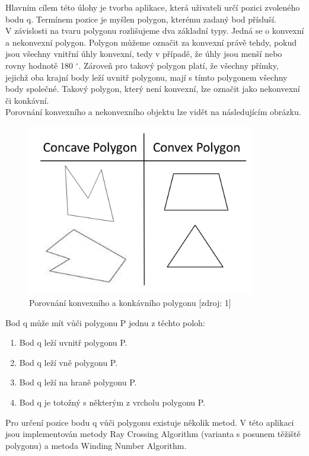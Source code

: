 \documentclass[a4paper, 12pt]{article}
\begin{document}
Hlavním cílem této úlohy je tvorba aplikace, která uživateli určí pozici zvoleného bodu q. Termínem pozice je myšlen polygon, kterému zadaný bod přísluší.
\\

V závislosti na tvaru polygonu rozlišujeme dva základní typy. Jedná se o konvexní a nekonvexní polygon. Polygon můžeme označit za konvexní právě tehdy, pokud jsou všechny vnitřní úhly konvexní, tedy v případě, že úhly jsou menší nebo rovny hodnotě 180 $^\circ$. Zároveň pro takový polygon platí, že všechny přímky, jejichž oba krajní body leží uvnitř polygonu, mají s tímto polygonem všechny body společné. Takový polygon, který není konvexní, lze označit jako nekonvexní či konkávní.
\\

Porovnání konvexního a nekonvexního objektu lze vidět na následujícím obrázku.
\begin{figure}[h]
	\centering
	\includegraphics[width=10cm]{typy_polygonu.jpg}
	\caption{Porovnání konvexního a konkávního polygonu [zdroj: 1]}
\end{figure}

Bod q může mít vůči polygonu P jednu z těchto poloh:
\begin{enumerate}
\item Bod q leží uvnitř polygonu P.
\item Bod q leží vně polygonu P.
\item Bod q leží na hraně polygonu P.
\item Bod q je totožný s některým z vrcholu polygonu P.
\end{enumerate}


Pro určení pozice bodu q vůči polygonu existuje několik metod. V této aplikaci jsou implementován metody Ray Crossing Algorithm (varianta s posunem těžiště polygonu) a metoda Winding Number Algorithm.
\end{document}
